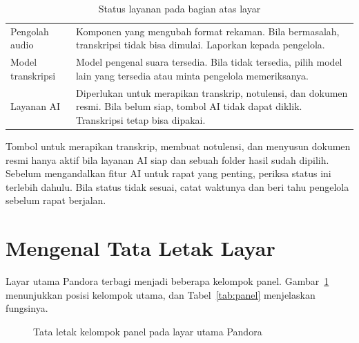 \begin{table}[H]
\caption{Status layanan pada bagian atas layar}
\label{tab:status}
{\small
\begin{tabularx}{\linewidth}{@{}P{4.2cm}Y@{}}
\toprule
{} &  \\
\midrule
Pengolah audio & Komponen yang mengubah format rekaman. Bila bermasalah, transkripsi tidak bisa dimulai. Laporkan kepada pengelola. \\
Model transkripsi & Model pengenal suara tersedia. Bila tidak tersedia, pilih model lain yang tersedia atau minta pengelola memeriksanya. \\
Layanan AI & Diperlukan untuk merapikan transkrip, notulensi, dan dokumen resmi. Bila belum siap, tombol AI tidak dapat diklik. Transkripsi tetap bisa dipakai. \\
\bottomrule
\end{tabularx}
}
\end{table}

Tombol untuk merapikan transkrip, membuat notulensi, dan menyusun dokumen resmi hanya aktif bila layanan AI siap dan sebuah folder hasil sudah dipilih. Sebelum mengandalkan fitur AI untuk rapat yang penting, periksa status ini terlebih dahulu. Bila status tidak sesuai, catat waktunya dan beri tahu pengelola sebelum rapat berjalan.

\section{Mengenal Tata Letak Layar}
Layar utama Pandora terbagi menjadi beberapa kelompok panel. Gambar~\ref{fig:tata-letak} menunjukkan posisi kelompok utama, dan Tabel~\ref{tab:panel} menjelaskan fungsinya.

\begin{figure}[H]
\centering
{}
\caption{Tata letak kelompok panel pada layar utama Pandora}
\label{fig:tata-letak}
\end{figure}

